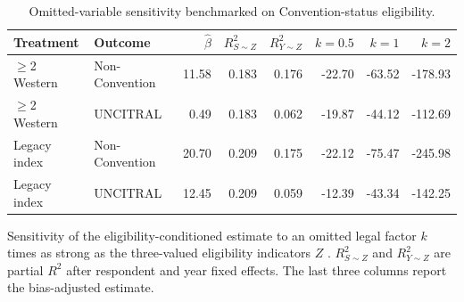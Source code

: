\begin{table}[t]
\centering
\caption{Omitted-variable sensitivity benchmarked on Convention-status eligibility.}
\label{tab:ovb}
\small
\setlength{\tabcolsep}{4pt}
\begin{tabular}{llrrrrrr}
\toprule
Treatment & Outcome & $\hat\beta$ & $R^2_{S\sim Z}$ & $R^2_{Y\sim Z}$ & $k=0.5$ & $k=1$ & $k=2$ \\
\midrule
$\geq$2 Western & Non-Convention & 11.58 & 0.183 & 0.176 & -22.70 & -63.52 & -178.93 \\
$\geq$2 Western & UNCITRAL & 0.49 & 0.183 & 0.062 & -19.87 & -44.12 & -112.69 \\
Legacy index & Non-Convention & 20.70 & 0.209 & 0.175 & -22.12 & -75.47 & -245.98 \\
Legacy index & UNCITRAL & 12.45 & 0.209 & 0.059 & -12.39 & -43.34 & -142.25 \\
\bottomrule
\end{tabular}
\par\medskip
\begin{minipage}{0.95\linewidth}\footnotesize
Sensitivity of the eligibility-conditioned estimate to an omitted legal factor $k$ times as strong as the three-valued eligibility indicators $Z$ \citep{cinelli2020}. $R^2_{S\sim Z}$ and $R^2_{Y\sim Z}$ are partial $R^2$ after respondent and year fixed effects. The last three columns report the bias-adjusted estimate.
\end{minipage}
\end{table}
